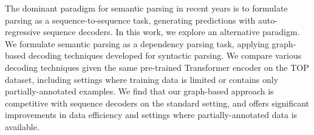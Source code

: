 The dominant paradigm for semantic parsing in recent years is to formulate parsing as a sequence-to-sequence task, generating predictions with auto-regressive sequence decoders. In this work, we explore an alternative paradigm. We formulate semantic parsing as a dependency parsing task, applying graph-based decoding techniques developed for syntactic parsing. We compare various decoding techniques given the same pre-trained Transformer encoder on the TOP dataset, including settings where training data is limited or contains only partially-annotated examples. We find that our graph-based approach is competitive with sequence decoders on the standard setting, and offers significant improvements in data efficiency and settings where partially-annotated data is available.
